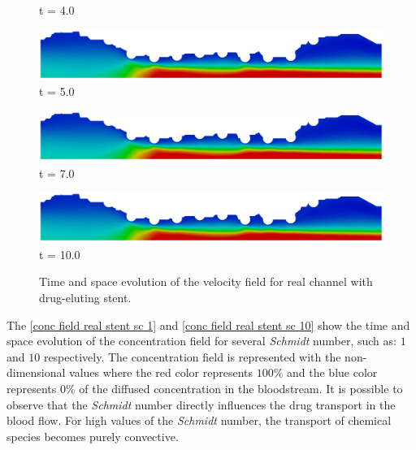 \begin{figure}[H]
\begin{minipage}{.50\linewidth}
      t = 4.0
     \end{minipage}%
     \begin{minipage}{.50\linewidth}
      \centering
      \includegraphics[scale=0.12]{./02_chaps/cap_solution/figure/vel_RealStrut10000.png}\\
      t = 5.0
     \end{minipage}
     \begin{minipage}{.50\linewidth}
     \medskip
      \centering
      \includegraphics[scale=0.12]{./02_chaps/cap_solution/figure/vel_RealStrut14000.png}\\
      t = 7.0
     \end{minipage}%
     \begin{minipage}{.50\linewidth}
     \medskip
      \centering
      \includegraphics[scale=0.12]{./02_chaps/cap_solution/figure/vel_RealStrut20000.png}\\
      t = 10.0
     \end{minipage}
     \medskip
     \caption{
Time and space evolution of the velocity field for real channel with
drug-eluting stent.}
     \label{velocity field real stent}
\end{figure}

\vspace{1cm}
The \ref{conc field real stent sc 1} and 
\ref{conc field real stent sc 10} show the time and space evolution 
of the concentration field for several \textit{Schmidt} number, 
such as: $1$ and $10$ respectively. The concentration field is 
represented with the non-dimensional values where the red color 
represents $100$\% and the blue color represents $0$\% 
of the diffused concentration in the bloodstream. 
It is possible to observe that the \textit{Schmidt} number directly 
influences the drug transport in the blood flow. 
For high values of the \textit{Schmidt} number, 
the transport of chemical species becomes purely convective.


